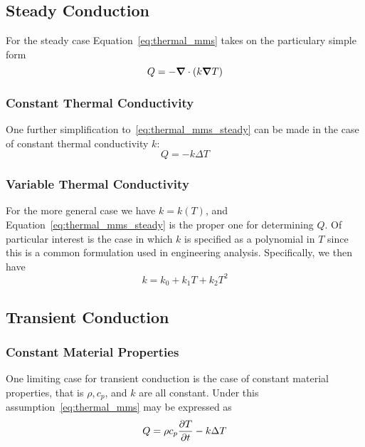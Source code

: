 \subsection{Steady Conduction}
For the steady case Equation~\eqref{eq:thermal_mms} takes on the particulary simple form
\begin{equation}
  Q =  - {\boldsymbol{\nabla}} {}\cdot\left(k {\boldsymbol{\nabla}} {T}\right)
  \label{eq:thermal_mms_steady}
\end{equation}

\subsubsection{Constant Thermal Conductivity}
One further simplification to~\eqref{eq:thermal_mms_steady} can be made in the case of constant thermal conductivity $k$:
\begin{equation}
  Q =  - k \Delta T
  \label{eq:thermal_mms_steady_kconst}
\end{equation}

\subsubsection{Variable Thermal Conductivity}
For the more general case we have $k=k\left(T\right)$, and Equation~\eqref{eq:thermal_mms_steady} is the proper one for determining $Q$.  Of particular interest is the case in which $k$ is specified as a polynomial in $T$ since this is a common formulation used in engineering analysis.  Specifically, we then have
\begin{equation}
  k = k_0 + k_1 T + k_2 T^2
\end{equation}

\subsection{Transient Conduction}
\subsubsection{Constant Material Properties}
One limiting case for transient conduction is the case of constant material properties, that is $\rho, c_p$, and $k$ are all constant. Under this assumption~\eqref{eq:thermal_mms} may be expressed as
\begin{equation}
  Q = \rho c_p {\frac{\partial{T}}{\partial{t}}} - k \Delta T
  \label{eq:thermal_mms_constprop}
\end{equation}

